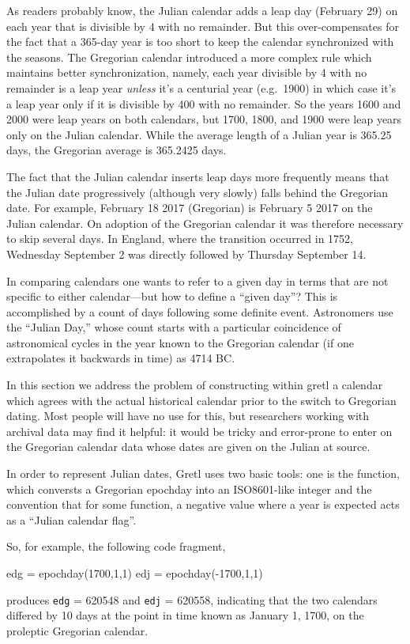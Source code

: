 As readers probably know, the Julian calendar adds a leap day
(February 29) on each year that is divisible by 4 with no
remainder. But this over-compensates for the fact that a 365-day year
is too short to keep the calendar synchronized with the seasons. The
Gregorian calendar introduced a more complex rule which maintains
better synchronization, namely, each year divisible by 4 with no
remainder is a leap year \textit{unless} it's a centurial year (e.g.\
1900) in which case it's a leap year only if it is divisible by 400
with no remainder.  So the years 1600 and 2000 were leap years on both
calendars, but 1700, 1800, and 1900 were leap years only on the Julian
calendar. While the average length of a Julian year is 365.25 days,
the Gregorian average is 365.2425 days. 

The fact that the Julian calendar inserts leap days more frequently
means that the Julian date progressively (although very slowly) falls
behind the Gregorian date. For example, February 18 2017 (Gregorian)
is February 5 2017 on the Julian calendar. On adoption of the
Gregorian calendar it was therefore necessary to skip several days. In
England, where the transition occurred in 1752, Wednesday September 2
was directly followed by Thursday September 14.

In comparing calendars one wants to refer to a given day in terms that
are not specific to either calendar---but how to define a ``given
day''? This is accomplished by a count of days following some definite
event. Astronomers use the ``Julian Day,'' whose count starts with a
particular coincidence of astronomical cycles in the year known to the
Gregorian calendar (if one extrapolates it backwards in time) as 4714
BC.

In this section we address the problem of constructing within gretl a
calendar which agrees with the actual historical calendar prior to
the switch to Gregorian dating. Most people will have no use for
this, but researchers working with archival data may find it helpful:
it would be tricky and error-prone to enter on the Gregorian calendar
data whose dates are given on the Julian at source.

In order to represent Julian dates, Gretl uses two basic tools: one is
the \cmd{juldate} function, which conversts a Gregorian epochday into
an ISO8601-like integer and the convention that for some function,
a negative value where a year is expected acts as a ``Julian calendar
flag''.

So, for example, the following code fragment,
%
\begin{code}
edg = epochday(1700,1,1)
edj = epochday(-1700,1,1)
\end{code}
%
produces \texttt{edg} = 620548 and \texttt{edj} = 620558, indicating
that the two calendars differed by 10 days at the point in time
known as January 1, 1700, on the proleptic Gregorian calendar.

